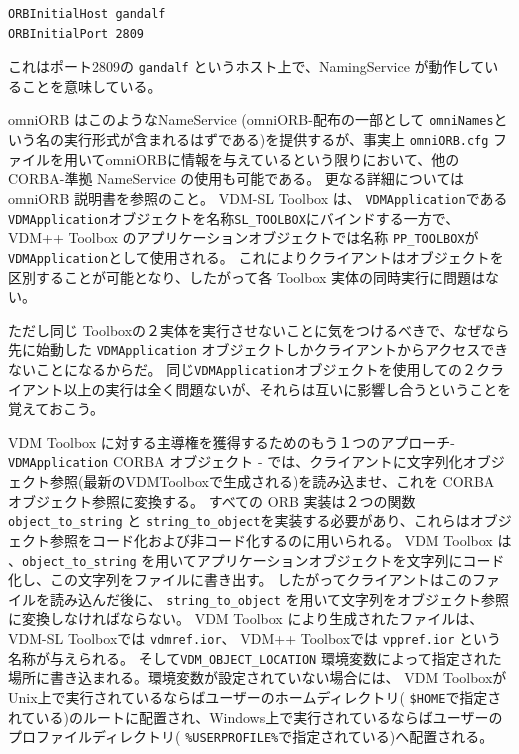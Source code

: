 \documentclass[\pformat,12pt]{jarticle}
\begin{document}
\begin{verbatim}
ORBInitialHost gandalf
ORBInitialPort 2809
\end{verbatim}

これはポート2809の {\tt gandalf} というホスト上で、NamingService が動作していることを意味している。

omniORB はこのようなNameService (omniORB-配布の一部として \texttt{omniNames}という名の実行形式が含まれるはずである)を提供するが、事実上 \texttt{omniORB.cfg} ファイルを用いてomniORBに情報を与えているという限りにおいて、他の CORBA-準拠 NameService の使用も可能である。
更なる詳細についてはomniORB 説明書を参照のこと。
 VDM-SL Toolbox は、 {\tt VDMApplication}である {\tt VDMApplication}オブジェクトを名称{\tt SL\_TOOLBOX}にバインドする一方で、VDM++ Toolbox のアプリケーションオブジェクトでは名称 {\tt PP\_TOOLBOX}が {\tt VDMApplication}として使用される。
これによりクライアントはオブジェクトを区別することが可能となり、したがって各 Toolbox 実体の同時実行に問題はない。

ただし同じ Toolboxの２実体を実行させないことに気をつけるべきで、なぜなら先に始動した {\tt VDMApplication} オブジェクトしかクライアントからアクセスできないことになるからだ。
同じ{\tt VDMApplication}オブジェクトを使用しての２クライアント以上の実行は全く問題ないが、それらは互いに影響し合うということを覚えておこう。

 VDM Toolbox に対する主導権を獲得するためのもう１つのアプローチ- {\tt VDMApplication} CORBA オブジェクト - では、クライアントに文字列化オブジェクト参照(最新のVDMToolboxで生成される)を読み込ませ、これを CORBA オブジェクト参照に変換する。
すべての ORB 実装は２つの関数 {\tt object\_to\_string} と {\tt  string\_to\_object}を実装する必要があり、これらはオブジェクト参照をコード化および非コード化するのに用いられる。
 VDM Toolbox は 、{\tt object\_to\_string} を用いてアプリケーションオブジェクトを文字列にコード化し、この文字列をファイルに書き出す。
したがってクライアントはこのファイルを読み込んだ後に、 {\tt  string\_to\_object} を用いて文字列をオブジェクト参照に変換しなければならない。
 VDM Toolbox により生成されたファイルは、VDM-SL Toolboxでは {\tt  vdmref.ior}、 VDM++ Toolboxでは {\tt vppref.ior} という名称が与えられる。
そして{\tt VDM\_OBJECT\_LOCATION} 環境変数によって指定された場所に書き込まれる。環境変数が設定されていない場合には、 VDM ToolboxがUnix上で実行されているならばユーザーのホームディレクトリ( {\tt  \$HOME}で指定されている)のルートに配置され、Windows上で実行されているならばユーザーのプロファイルディレクトリ( {\tt \%USERPROFILE\%}で指定されている)へ配置される。
\end{document}
